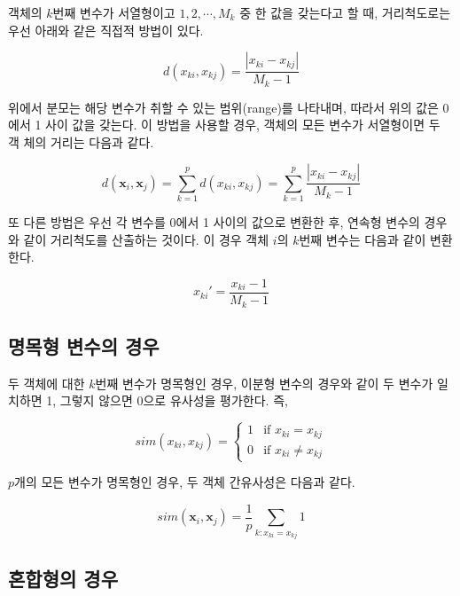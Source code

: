 \documentclass[
]{book}
\begin{document}
객체의 \(k\)번째 변수가 서열형이고 \(1, 2, \cdots, M_k\) 중 한 값을 갖는다고 할 때, 거리척도로는 우선 아래와 같은 직접적 방법이 있다.

\begin{equation*}
d(x_{ki}, x_{kj}) = \frac{|x_{ki} - x_{kj}|}{M_k - 1}
\end{equation*}

위에서 분모는 해당 변수가 취할 수 있는 범위(range)를 나타내며, 따라서 위의 값은 0에서 1 사이 값을 갖는다. 이 방법을 사용할 경우, 객체의 모든 변수가 서열형이면 두 객 체의 거리는 다음과 같다.

\begin{equation*}
d(\mathbf{x}_i, \mathbf{x}_j) = \sum_{k = 1}^{p} d(x_{ki}, x_{kj}) = \sum_{k = 1}^{p} \frac{|x_{ki} - x_{kj}|}{M_k - 1}
\end{equation*}

또 다른 방법은 우선 각 변수를 0에서 1 사이의 값으로 변환한 후, 연속형 변수의 경우와 같이 거리척도를 산출하는 것이다. 이 경우 객체 \(i\)의 \(k\)번째 변수는 다음과 같이 변환한다.

\begin{equation*}
x_{ki}' = \frac{x_{ki} - 1}{M_k - 1}
\end{equation*}

\hypertarget{nominal-similarity-metric}{%
\subsection{명목형 변수의 경우}\label{nominal-similarity-metric}}

두 객체에 대한 \(k\)번째 변수가 명목형인 경우, 이분형 변수의 경우와 같이 두 변수가 일치하면 1, 그렇지 않으면 0으로 유사성을 평가한다. 즉,

\begin{equation*}
sim(x_{ki}, x_{kj}) = \begin{cases}
1 & \text{if } x_{ki} = x_{kj}\\
0 & \text{if } x_{ki} \neq x_{kj}
\end{cases}
\end{equation*}

\(p\)개의 모든 변수가 명목형인 경우, 두 객체 간유사성은 다음과 같다.

\begin{equation*}
sim(\mathbf{x}_i, \mathbf{x}_j) = \frac{1}{p} \sum_{k: x_{ki} = x_{kj}} 1
\end{equation*}

\hypertarget{mixed-similarity-metric}{%
\subsection{혼합형의 경우}\label{mixed-similarity-metric}}
\end{document}

